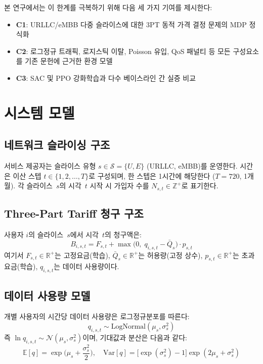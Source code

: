 \documentclass[10pt, twocolumn]{article}
\begin{document}
본 연구에서는 이 한계를 극복하기 위해 다음 세 가지 기여를 제시한다:
\begin{itemize}
  \item \textbf{C1}: URLLC/eMBB 다중 슬라이스에 대한 3PT 동적 가격 결정 문제의 MDP 정식화
  \item \textbf{C2}: 로그정규 트래픽\cite{alasmar2021}, 로지스틱 이탈\cite{ahn2006}, Poisson 유입\cite{chen2022}, QoS 패널티\cite{kim2019} 등 모든 구성요소를 기존 문헌에 근거한 환경 모델
  \item \textbf{C3}: SAC 및 PPO 강화학습과 다수 베이스라인 간 실증 비교
\end{itemize}

\section{시스템 모델}

\subsection{네트워크 슬라이싱 구조}

서비스 제공자는 슬라이스 유형 $s \in \mathcal{S} = \{U, E\}$ (URLLC, eMBB)를 운영한다.
시간은 이산 스텝 $t \in \{1, 2, \ldots, T\}$로 구성되며, 한 스텝은 1시간에 해당한다 ($T=720$, 1개월).
각 슬라이스~$s$의 시각~$t$ 시작 시 가입자 수를 $N_{s,t} \in \mathbb{Z}^+$로 표기한다.

\subsection{Three-Part Tariff 청구 구조}

사용자 $i$의 슬라이스~$s$에서 시각~$t$의 청구액은\cite{wu2023}:
\begin{equation}
  B_{i,s,t} = F_{s,t} + \max\!\big(0,\; q_{i,s,t} - \bar{Q}_s\big) \cdot p_{s,t}
  \label{eq:bill}
\end{equation}
여기서 $F_{s,t} \in \mathbb{R}^+$는 고정요금(학습), $\bar{Q}_s \in \mathbb{R}^+$는 허용량(고정 상수), $p_{s,t} \in \mathbb{R}^+$는 초과요금(학습), $q_{i,s,t}$는 데이터 사용량이다.

\subsection{데이터 사용량 모델}

개별 사용자의 시간당 데이터 사용량은 로그정규분포를 따른다\cite{alasmar2021}:
\begin{equation}
  q_{i,s,t} \sim \text{LogNormal}(\mu_s, \sigma_s^2)
  \label{eq:usage}
\end{equation}
즉 $\ln q_{i,s,t} \sim \mathcal{N}(\mu_s, \sigma_s^2)$이며, 기대값과 분산은 다음과 같다:
\[
  \mathbb{E}[q] = \exp\!\Big(\mu_s + \frac{\sigma_s^2}{2}\Big), \quad
  \text{Var}[q] = \big[\exp(\sigma_s^2)-1\big]\exp(2\mu_s + \sigma_s^2)
\]
\end{document}
